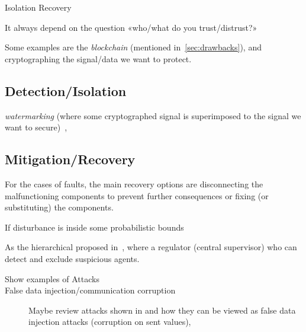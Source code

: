 \documentclass[../main.tex]{subfiles}
\begin{document}
Isolation
Recovery

It always depend on the question «who/what do you trust/distrust?»

Some examples are the \emph{blockchain} (mentioned in~\ref{sec:drawbacks}), and cryptographing the signal/data we want to protect.

\subsection{Detection/Isolation}
\emph{watermarking} (where some cryptographed signal is superimposed to the signal we want to secure)~\cite{MoEtAl2015,SatchidanandanKumar2017,KshetriVoas2017,LuciaEtAl2021},
\cite{FortiEtAl2016}

\subsection{Mitigation/Recovery}
For the cases of faults, the main recovery options are disconnecting the malfunctioning components to prevent further consequences or fixing (or substituting) the components.

If disturbance is inside some probabilistic bounds \cite{AnandutaEtAl2020}



As the hierarchical proposed in~\cite{BraunEtAl2020}, where a regulator (central supervisor) who can detect and exclude suspicious agents.


\begin{description}
  \item[Show examples of Attacks]
  \item[False data injection/communication corruption] Maybe review attacks shown in \cite{VelardeEtAl2018} and how they can be viewed as false data injection attacks (corruption on sent values), 
\end{description}
\end{document}
